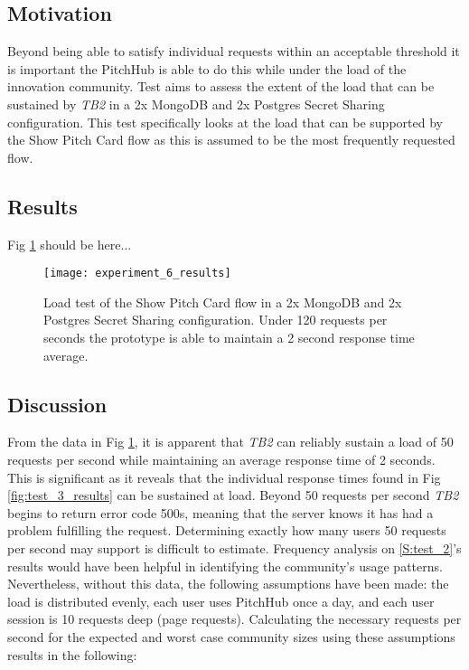 \subsection{Motivation}
Beyond being able to satisfy individual requests within an acceptable threshold it is important the PitchHub is able to do this while under the load of the innovation community. Test  aims to assess the extent of the load that can be sustained by \textit{TB2} in a 2x MongoDB and 2x Postgres Secret Sharing configuration. This test specifically looks at the load that can be supported by the Show Pitch Card flow as this is assumed to be the most frequently requested flow.

\subsection{Results}

Fig \ref{fig:test_6_results} should be here...

\begin{figure}[ht]
    \centering
    \texttt{[image: experiment\_6\_results]}
    \caption{Load test of the Show Pitch Card flow in a 2x MongoDB and 2x Postgres Secret Sharing configuration. Under 120 requests per seconds the prototype is able to maintain a 2 second response time average. }
    \label{fig:test_6_results}
\end{figure}

\subsection{Discussion}
From the data in Fig \ref{fig:test_6_results}, it is apparent that \textit{TB2} can reliably sustain a load of 50 requests per second while maintaining an average response time of 2 seconds. This is significant as it reveals that the individual response times found in Fig \ref{fig:test_3_results} can be sustained at load. Beyond 50 requests per second \textit{TB2} begins to return error code 500s, meaning that the server knows it has had a problem fulfilling the request.
Determining exactly how many users 50 requests per second may support is difficult to estimate. Frequency analysis on \ref{S:test_2}'s results would have been helpful in identifying the community's usage patterns. Nevertheless, without this data, the following assumptions have been made: the load is distributed evenly, each user uses PitchHub once a day, and each user session is 10 requests deep (page requests). Calculating the necessary requests per second for the expected and worst case community sizes using these assumptions results in the following:

